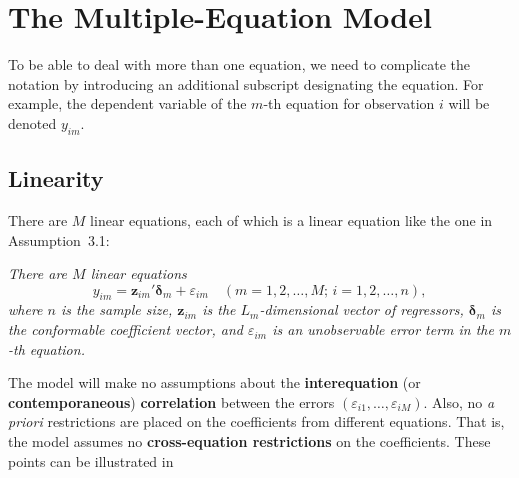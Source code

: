 
\section{The Multiple-Equation Model}
\label{sec:4.1}

To be able to deal with more than one equation, we need to complicate the notation
by introducing an additional subscript designating the equation. For example, the
dependent variable of the $m$-th equation for observation $i$ will be denoted $y_{im}$.

\subsection*{Linearity}

There are $M$ linear equations, each of which is a linear equation like the one in
Assumption~3.1:

\begin{assumption}[linearity]
\label{ass:4.1}
\textit{There are $M$ linear equations}
\begin{equation}
y_{im} = \mathbf{z}_{im}' \boldsymbol{\delta}_m + \varepsilon_{im}
\quad (m = 1, 2, \ldots, M;\, i = 1, 2, \ldots, n),
\label{eq:4.1.1}
\end{equation}
\textit{where $n$ is the sample size, $\mathbf{z}_{im}$ is the $L_m$-dimensional vector of regressors,
$\boldsymbol{\delta}_m$ is the conformable coefficient vector, and $\varepsilon_{im}$ is an unobservable
error term in the $m$-th equation.}
\end{assumption}

The model will make no assumptions about the \textbf{interequation} (or \textbf{contemporaneous})
\textbf{correlation} between the errors $(\varepsilon_{i1}, \ldots, \varepsilon_{iM})$.
Also, no \textit{a priori} restrictions are placed on the coefficients from different equations.
That is, the model assumes no \textbf{cross-equation restrictions} on the coefficients.
These points can be illustrated in

